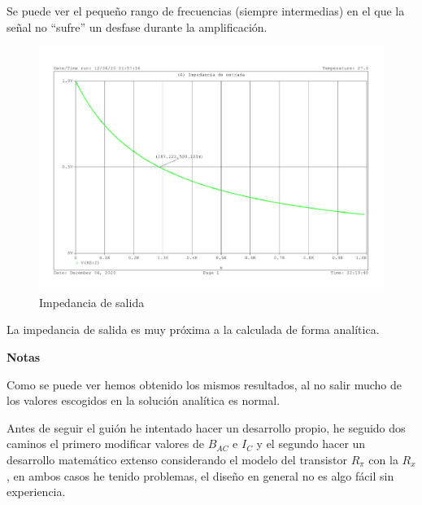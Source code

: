  Se puede ver el pequeño rango de frecuencias (siempre intermedias)
  en el que la señal no ``sufre'' un desfase durante la amplificación.
      \begin{figure}[H]
    \centering  
    \includegraphics[scale=0.42,page=6,trim]{images/problema_puntuable_5.pdf}
    \caption{Impedancia de salida}
  \end{figure}

  La impedancia de salida es muy próxima a la calculada de forma analítica.\\

  
\begin{center}
  \textbf{Notas}
\end{center}

Como se puede ver hemos obtenido los mismos resultados, al no salir
mucho de los valores escogidos en la solución analítica es normal.


Antes de seguir el guión he intentado hacer un desarrollo propio, he
seguido dos caminos el primero modificar valores de $B_{AC}$ e $I_C$ y
el segundo hacer un desarrollo matemático extenso considerando el
modelo del transistor $R_{\pi}$ con la $R_x$, en ambos casos he tenido
problemas, el diseño en general no es algo fácil sin experiencia.

